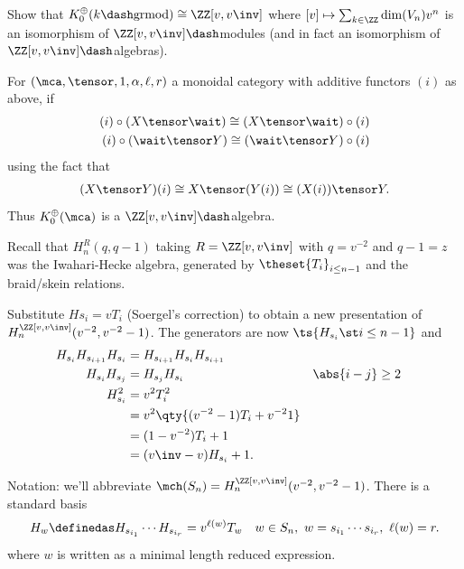 \begin{exercise}[?]

Show that \(K_0^\oplus(k\dash\text{grmod}) \cong \ZZ[v, v\inv]\) where
\([v] \mapsto \sum_{k\in \ZZ} \dim(V_n)v^n\) is an isomorphism of
\(\ZZ[v,v\inv]\dash\)modules (and in fact an isomorphism of
\(\ZZ[v,v\inv]\dash\)algebras).

\end{exercise}

\begin{remark}

For \((\mca, \tensor, 1, \alpha, \ell, r)\) a monoidal category with
additive functors \((i)\) as above, if
\begin{align*}
(i) \circ (X\tensor \wait) \cong (X\tensor \wait) \circ (i) \\
(i) \circ (\wait \tensor Y) \cong (\wait \tensor Y) \circ (i) 
\end{align*} using the fact that
\begin{align*}
(X\tensor Y)(i) \cong X \tensor (Y(i)) \cong (X(i)) \tensor Y
.\end{align*} Thus \(K_0^\oplus(\mca)\) is a
\(\ZZ[v, v\inv]\dash\)algebra.

\end{remark}

Recall that \(H_n^R(q, q-1)\) taking \(R = \ZZ[v, v\inv]\) with
\(q=v^{-2}\) and \(q-1 = z\) was the Iwahari-Hecke algebra, generated by
\(\theset{T_i}_{i\leq n-1}\) and the braid/skein relations.

Substitute \(Hs_i = vT_i\) (Soergel's correction) to obtain a new
presentation of \(H_n^{\ZZ[v, v\inv]}(v^{-2}, v^{-2}-1)\). The
generators are now \(\ts{ H_{s_i} \st i\leq n-1}\) and
\begin{align*}  
H_{s_i} H_{s_{i+1}} H_{s_i} 
&= H_{s_{i+1}} H_{s_i} H_{s_{i+1}} \\
H_{s_i} H_{s_j} 
&= H_{s_j}  H_{s_i} 
&& 
\abs{i-j} \geq 2 \\
H_{s_i}^2 
&= v^2 T_i^2 \\
&= v^2 \qty{ (v^{-2} - 1)T_i + v^{-2}1} \\
&= (1-v^{-2}) T_i + 1 \\
&= (v\inv - v) H_{s_i} +1
.\end{align*}

Notation: we'll abbreviate
\(\mch(S_n) = H_n^{\ZZ[v, v\inv]} (v^{-2}, v^{-2} - 1)\). There is a
standard basis
\begin{align*}  
H_w \definedas H_{s_{i_1}} \cdots H_{s_{i_r}} = v^{\ell(w)} T_w 
&&
w\in S_n,\,\, 
w = s_{i_1} \cdots s_{i_r}, \,\, 
\ell(w) = r
 .\end{align*} where \(w\) is written as a minimal length reduced
expression.

